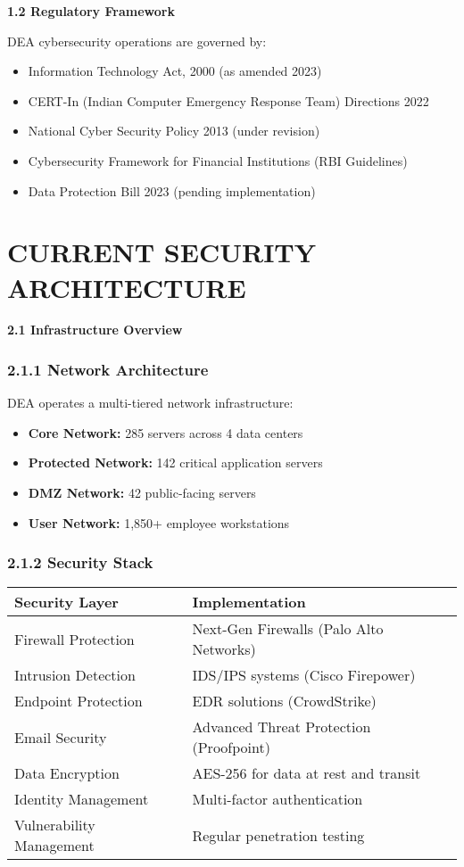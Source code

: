 \documentclass[12pt,a4paper]{report}
\newcommand{\sectionheader}[1]{\textbf{\color{govblue}#1}}
\begin{document}
\sectionheader{1.2 Regulatory Framework}

DEA cybersecurity operations are governed by:
\begin{itemize}[leftmargin=*, itemsep=3pt]
    \item Information Technology Act, 2000 (as amended 2023)
    \item CERT-In (Indian Computer Emergency Response Team) Directions 2022
    \item National Cyber Security Policy 2013 (under revision)
    \item Cybersecurity Framework for Financial Institutions (RBI Guidelines)
    \item Data Protection Bill 2023 (pending implementation)
\end{itemize}

\chapter{CURRENT SECURITY ARCHITECTURE}

\sectionheader{2.1 Infrastructure Overview}

\subsection*{2.1.1 Network Architecture}
DEA operates a multi-tiered network infrastructure:
\begin{itemize}[leftmargin=*, itemsep=3pt]
    \item \textbf{Core Network:} 285 servers across 4 data centers
    \item \textbf{Protected Network:} 142 critical application servers
    \item \textbf{DMZ Network:} 42 public-facing servers
    \item \textbf{User Network:} 1,850+ employee workstations
\end{itemize}

\subsection*{2.1.2 Security Stack}
\begin{table}[h]
\centering
\begin{tabular}{@{}ll@{}}
\toprule
\textbf{Security Layer} & \textbf{Implementation} \\
\midrule
Firewall Protection & Next-Gen Firewalls (Palo Alto Networks) \\
Intrusion Detection & IDS/IPS systems (Cisco Firepower) \\
Endpoint Protection & EDR solutions (CrowdStrike) \\
Email Security & Advanced Threat Protection (Proofpoint) \\
Data Encryption & AES-256 for data at rest and transit \\
Identity Management & Multi-factor authentication \\
Vulnerability Management & Regular penetration testing \\
\bottomrule
\end{tabular}
\end{table}
\end{document}
